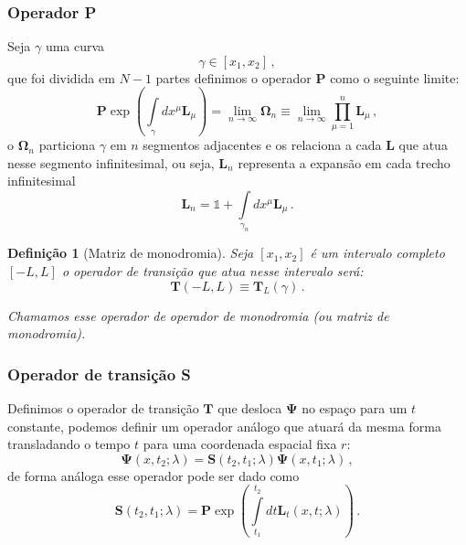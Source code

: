 \documentclass[25pt]{article}
\numberwithin{equation}{subsection} %
\newtheorem{defi}{Definição}
\newcommand{\commutador}[2]{\left[#1,#2\right]}
\newcommand{\OP}[1]{\mathbf{#1}}
\begin{document}
\subsubsection{Operador P}

Seja $\gamma$ uma curva $$\gamma\in\left[x_1,x_2\right]\,,$$ que foi dividida em $N-1$ partes %
definimos o operador $\OP{P}$ como o seguinte limite:
\begin{equation}
\OP{P}\exp\left(\int\limits_{\gamma}dx^{\mu}\OP{L}_{\mu}\right)=\lim_{n\to\infty}\bm{\Omega}_{n}\equiv \lim_{n\to\infty}\prod_{\mu=1}^{n}\OP{L}_{\mu}\,,
\end{equation}
o $\bm{\Omega}_{n}$ particiona $\gamma$ em $n$ segmentos adjacentes e os relaciona a cada $\OP{L}$ que atua nesse segmento infinitesimal, ou seja, $\OP{L}_{n}$ representa a expansão em cada trecho infinitesimal
\begin{equation}
\OP{L}_{n}=\mathbb{1}+\int\limits_{\gamma_n}dx^{\mu}\OP{L}_{\mu}\,.
\end{equation}

\begin{defi}[Matriz de monodromia]
Seja $\commutador{x_1}{x_2}$ é um intervalo completo $\commutador{-L}{L}$ o operador de transição que atua nesse intervalo será:
\begin{displaymath}
\OP{T}\left(-L,L\right)\equiv\OP{T}_{L}(\gamma)\,.
\end{displaymath}

Chamamos esse operador de operador de monodromia (ou matriz de monodromia).
\end{defi}

\subsubsection{Operador de transição S}

Definimos o operador de transição $\OP{T}$ que desloca $\bm{\Psi}$ no espaço para um $t$ constante, podemos definir um operador análogo que atuará da mesma forma transladando o tempo $t$ para uma coordenada espacial fixa $r$:
\begin{equation}
\bm{\Psi}(x,t_2;\lambda)=\OP{S}(t_2,t_1;\lambda)\bm{\Psi}(x,t_1;\lambda)\,,
\end{equation}
de forma análoga esse operador pode ser dado como
\begin{equation}
\OP{S}(t_2,t_1;\lambda)=\OP{P}\exp\left(\int\limits_{t_1}^{t_2}dt\OP{L}_{t}\left(x,t;\lambda\right)\right)\,.
\end{equation}
\end{document}
